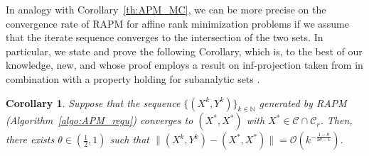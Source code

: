 \documentclass[pdflatex,sn-mathphys-num]{sn-jnl}
\numberwithin{equation}{section}%
\def\N{\mathbb{N}}
\theoremstyle{thmstyleone}%
\newtheorem{corollary}[theorem]{Corollary}%
\theoremstyle{thmstyletwo}%
\theoremstyle{thmstylethree}%
\begin{document}
{In analogy with Corollary~\ref{th:APM_MC}, we can be more precise on the convergence rate of RAPM for affine rank minimization problems if we assume that the iterate sequence converges to the intersection of the two sets. In particular, we state and prove the following Corollary, which is, to the best of our knowledge, new, and whose proof employs a result on inf-projection taken from \cite{Yu2022} in combination with a property holding for subanalytic sets \cite{Noll-etal-2016}. 

\begin{corollary}\label{thm:RAPM_precise_rate}
    Suppose that the sequence $\{(X^k,Y^k)\}_{k\in\N}$ generated by RAPM (Algorithm~\ref{algo:APM_regu}) converges to $(X^*,X^*)$ with $X^*\in \mathcal{C}\cap \mathcal{C}_r$. Then, there exists $\theta\in (\frac{1}{2},1)$ such that $\|(X^k,Y^k)-(X^*,X^*)\|=\mathcal{O}(k^{-\frac{1-\theta}{2\theta-1}})$.
\end{corollary}

}
\end{document}
